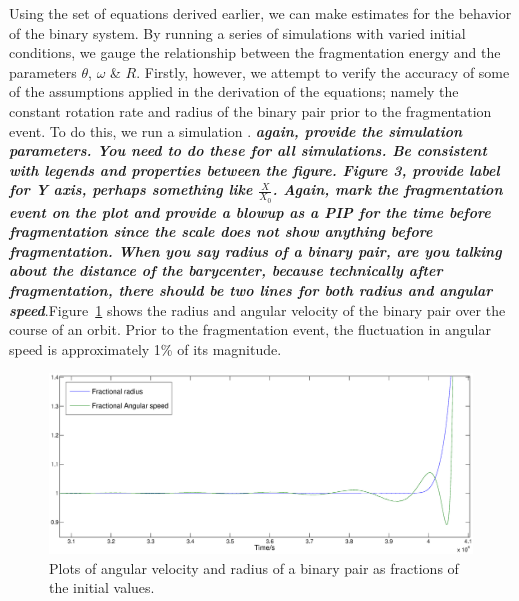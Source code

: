 \documentclass[letterpaper, preprint, paper,11pt]{AAS}	%
\begin{document}
Using the set of equations derived earlier, we can make estimates for the behavior of the binary system. By running a series of simulations with varied initial conditions, we gauge the relationship between the fragmentation energy and the parameters $\theta$, $\omega$ \& $R$. Firstly, however, we attempt to verify the accuracy of some of the assumptions applied in the derivation of the equations; namely the constant rotation rate and radius of the binary pair prior to the fragmentation event. To do this, we run a simulation . \textbf{\emph{again, provide the simulation parameters. You need to do these for all simulations. Be consistent with legends and properties between the figure. Figure 3, provide label for Y axis, perhaps something like $\frac{X}{X_0}$. Again, mark the fragmentation event on the plot and provide a blowup as a PIP for the time before fragmentation since the scale does not show anything before fragmentation. When you say radius of a binary pair, are you talking about the distance of the barycenter, because technically after fragmentation, there should be two lines for both radius and angular speed}}.Figure~\ref{fig:omega} shows the radius and angular velocity of the binary pair over the course of an orbit. Prior to the fragmentation event, the fluctuation in angular speed is approximately 1\% of its magnitude.

\begin{center}
\begin{figure}[H]
\centering
\centerline{\includegraphics[width=1.2\textwidth]{omega.eps}} 
\caption{Plots of angular velocity and radius of a binary pair as fractions of the initial values.} 
\label{fig:omega}
\end{figure}
\end{center}
\end{document}
